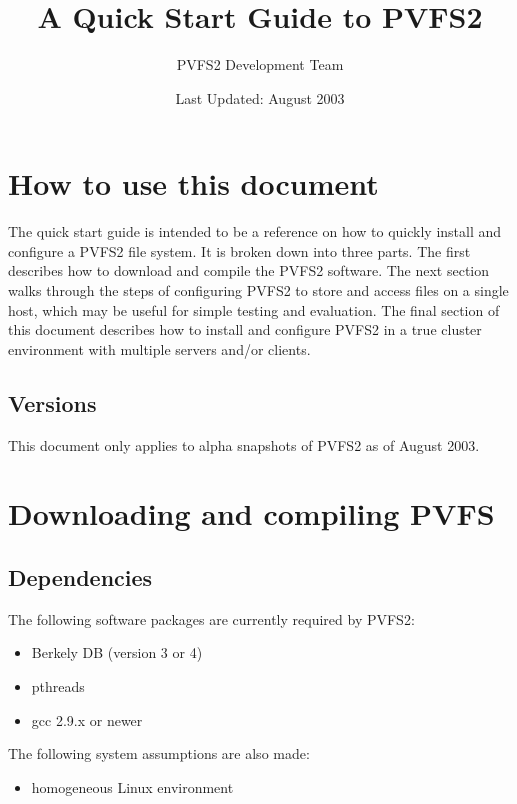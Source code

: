 \documentclass[11pt, letterpaper]{article}
\title{A Quick Start Guide to PVFS2}
\author{ PVFS2 Development Team }
\date{ Last Updated: August 2003 }
\begin{document}
\maketitle

\tableofcontents

\newpage

\thispagestyle{empty}

\setlength{\parindent}{0.0cm}

\section{How to use this document}

The quick start guide is intended to be a reference on how to quickly
install and configure a PVFS2 file system.  It is broken down into 
three parts.  The first
describes how to download and compile the PVFS2 software.  The next
section walks through the steps of configuring PVFS2 to store and
access files on a single host, which may be useful for simple testing
and evaluation.  The final section of this document describes how to
install and configure PVFS2 in a true cluster environment with multiple
servers and/or clients.

\subsection{Versions}

This document only applies to alpha snapshots of PVFS2 as of August 2003.

\section{Downloading and compiling PVFS}

\subsection{Dependencies}

The following software packages are currently required by PVFS2:
\begin{itemize}
\item Berkely DB (version 3 or 4)
\item pthreads
\item gcc 2.9.x or newer
\end{itemize}

The following system assumptions are also made:
\begin{itemize}
\item homogeneous Linux environment
\end{itemize}
\end{document}
